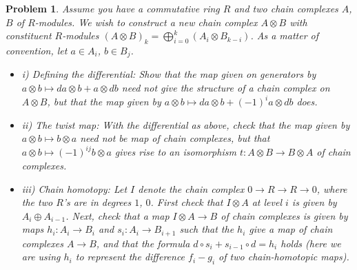 \documentclass{article}
\newtheorem{problem}{Problem}
\begin{document}
\begin{problem}
Assume you have a commutative ring $R$ and two chain complexes $A$, $B$ of $R$-modules. We wish to construct a new chain complex $A \otimes B$ with constituent $R$-modules $(A \otimes B)_k = \bigoplus_{i=0}^k (A_i \otimes B_{k-i})$. As a matter of convention, let $a \in A_i$, $b \in B_j$.\\
\begin{itemize}
\item i) Defining the differential: Show that the map given on generators by $a \otimes b \mapsto da \otimes b + a \otimes db$ need not give the structure of a chain complex on $A \otimes B$, but that the map given by $a \otimes b \mapsto da \otimes b + (-1)^i a \otimes db$ does.
\item ii) The twist map: With the differential as above, check that the map given by $a \otimes b \mapsto b \otimes a$ need not be map of chain complexes, but that $a \otimes b \mapsto (-1)^{ij} b \otimes a$ gives rise to an isomorphism $t : A \otimes B \to B \otimes A$ of chain complexes.
\item iii) Chain homotopy: Let $I$ denote the chain complex $0 \to R \to R \to 0$, where the two $R$'s are in degrees $1$, $0$. First check that $I \otimes A$ at level $i$ is given by $A_i \oplus A_{i-1}$. Next, check that a map $I \otimes A \to B$ of chain complexes is given by maps $h_i : A_i \to B_i$ and $s_i : A_i \to B_{i+1}$ such that the $h_i$ give a map of chain complexes $A \to B$, and that the formula $d \circ s_i + s_{i-1} \circ d = h_i$ holds (here we are using $h_i$ to represent the difference $f_i - g_i$ of two chain-homotopic maps).
\end{itemize}
\end{problem}
\end{document}
